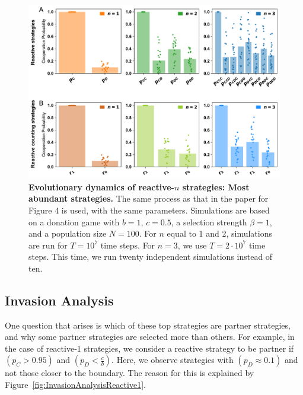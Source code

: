 \documentclass[11pt]{article}
\theoremstyle{plainCl1}
\theoremstyle{plainCl2}
\begin{document}
\begin{figure}[tbhp]
    \centering
    \includegraphics[width=\textwidth]{../../figures/siFig3AbundantStrategies.pdf}
    \caption{\textbf{Evolutionary dynamics of reactive-$n$ strategies: Most abundant strategies.}
    The same process as that in the paper for Figure 4 is used, with the same
    parameters. Simulations are based on a donation game with \(b\!=\!1\),
    \(c\!=\!0.5\), a selection strength \(\beta\!=\!1\), and a population size
    \(N\!=\!100\). For \(n\) equal to 1 and 2, simulations
    are run for \(T\!=\!10^7\) time steps. For \(n\!=\!3\), we use \(T\!=\!2 \cdot
    10^7\) time steps. This time, we run twenty independent simulations instead of
    ten.
    }\label{fig:siFigAbundantStrategies}
\end{figure}

\subsection{Invasion Analysis}

One question that arises is which of these top strategies are partner
strategies, and why some partner strategies are selected more than others. For
example, in the case of reactive-1 strategies, we consider a reactive strategy
to be partner if \((p_{C} > 0.95)\) and \((p_{D} < \frac{c}{b})\). Here, we
observe strategies with \((p_{D} \approx 0.1)\) and not those closer to the
boundary. The reason for this is explained by
Figure~\ref{fig:InvasionAnalysisReactive1}. \\
\end{document}
